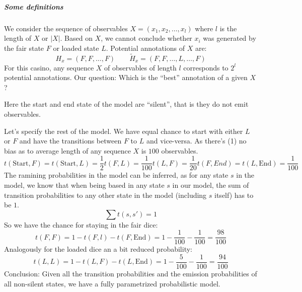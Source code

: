 \subparagraph{Some definitions}

We consider the sequence of observables \(X=(x_1,x_2,\dotsc,x_l)\) where \(l\)
is the length of \(X\) or \(|X|\).
Based on \(X\), we cannot conclude whether \(x_i\) was generated by the fair
state \(F\) or loaded state \(L\).
Potential annotations of \(X\) are:
\[
    H_x=(F,F,\dotsc,F) \qquad \widetilde{H}_x=(F,F,\dotsc,L,\dotsc,F)
\]
For this casino, any sequence \(X\) of observables of length \(l\)
corresponds to \(2^l\) potential annotations.
Our question: Which is the \enquote{best} annotation of a given \(X\)?

\begin{figure}
\centering
{}
\end{figure}
Here the start and end state of the model are \enquote{silent}, that is they do
not emit observables.

Let's specify the rest of the model.  We have equal chance to start with either
\(L\) or \(F\) and have the transitions between \(F\) to \(L\) and vice-versa.
As there's (1) no bias as to average length of any sequence \(X\) is \(100\)
observables.
\[
t(\text{Start},F) = t(\text{Start},L) = \frac{1}{2}
t(F,L) = \frac{1}{100}
t(L,F)=\frac{1}{20}
t(F,End) = t(L,\text{End}) = \frac{1}{100}
\]
The ramining probabilities in the model can be inferred, as for any state \(s\)
in the model, we know that when being based in any state \(s\) in our model, the
sum of transition probabilities to any other state in the model (including \(s\)
itself) has to be \(1\).
\[
  \sum t(s,s') = 1
\]
So we have the chance for staying in the fair dice:
\[
  t(F,F) = 1 - t(F,l) - t(F,\text{End})
         = 1 - \frac{1}{100} - \frac{1}{100}
         = \frac{98}{100}
\]
Analogously for the loaded dice an a bit reduced probability:
\[
  t(L,L) = 1 - t(L,F) - t(L,\text{End})
         = 1 - \frac{5}{100} - \frac{1}{100}
         = \frac{94}{100}
\]
Conclusion: Given all the transition probabilities and the emission
probabilities of all non-silent states, we have a fully parametrized
probabilistic model.

